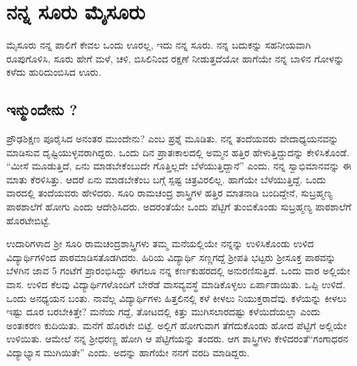 {\fontsize{14}{16}\selectfont
\chapter{ನನ್ನ ಸೂರು ಮೈಸೂರು}


ಮೈಸೂರು ನನ್ನ ಪಾಲಿಗೆ ಕೇವಲ ಒಂದು ಊರಲ್ಲ, ಇದು ನನ್ನ ಸೂರು.  ನನ್ನ \hbox{ಬದುಕನ್ನು} ಸಹನೀಯವಾಗಿ ರೂಪುಗೊಳಿಸಿ, ಸೂರು ಹೇಗೆ ಮಳೆ, ಚಳಿ, ಬಿಸಿಲಿನಿಂದ ರಕ್ಷಣೆ \hbox{ನೀಡುತ್ತದೆಯೋ} ಹಾಗೆಯೇ ನನ್ನ ಬಾಳಿನ ಗೋಳನ್ನು ಕಳೆದು ಹುರಿದುಂಬಿಸಿದ ಊರು.

\section*{ಇನ್ಮುಂದೇನು ?} 

ಪ್ರೌಢಶಿಕ್ಷಣ ಪೂರೈಸಿದ ಅನಂತರ ಮುಂದೇನು? ಎಂಬ ಪ್ರಶ್ನೆ ಮೂಡಿತು.  ನನ್ನ ತಂದೆಯವರು ವೇದಾಧ್ಯಯನವನ್ನು ಮಾಡಿಸುವ ದೃಷ್ಟಿಯುಳ್ಳವರಾಗಿದ್ದರು.  ಒಂದು ದಿನ ಪ್ರಾತಃಕಾಲದಲ್ಲಿ ಅಮ್ಮನ ಹತ್ತಿರ ಹೇಳುತ್ತಿದ್ದುದನ್ನು ಕೇಳಿಸಿಕೊಂಡೆ.  “ಮೀಸೆ \hbox{ಮೂಡುತ್ತಿದೆ,} ಏನು ಮಾಡಬೇಕೆಂಬುದೇ ಗೊತ್ತಿಲ್ಲದೇ ಬೆಳೆಯುತ್ತಿದ್ದಾನೆ” ಎಂದು.   ನನ್ನ ಸ್ವಾಭಿಮಾನವನ್ನು ಈ ಮಾತು ಕೆರಳಿಸಿತ್ತು.  ಆದರೆ ಏನು ಮಾಡಬೇಕೆಂಬ ಬಗ್ಗೆ ಸ್ಪಷ್ಟ ಚಿತ್ರವಿರಲಿಲ್ಲ.  ಹಾಗೆಯೇ ಬೆಳೆಯುತ್ತಿದ್ದೆ.  ಒಂದು ವಾರದಲ್ಲಿ ತಂದೆಯವರು ಹೇಳಿದರು.  ಸೂರಿ ರಾಮಚಂದ್ರ ಶಾಸ್ತ್ರಿಗಳ ಹತ್ತಿರ ಮಾತನಾಡಿ ಬಂದಿದ್ದೇನೆ, ಸುಬ್ರಹ್ಮಣ್ಯ \hbox{ಪಾಠಶಾಲೆಗೆ} ಹೋಗು ಎಂದು ಆದೇಶಿಸಿದರು. ಅದರಂತೆಯೇ ಒಂದು ಪೆಟ್ಟಿಗೆ ತುಂಬಿಕೊಂಡು \hbox{ಸುಬ್ರಹ್ಮಣ್ಯ} ಪಾಠಶಾಲೆಗೆ ಹೊರಟೇಬಿಟ್ಟೆ.  

ಉದಾರಿಗಳಾದ ಶ್ರೀ ಸೂರಿ ರಾಮಚಂದ್ರಶಾಸ್ತ್ರಿಗಳು ತಮ್ಮ ಮನೆಯಲ್ಲಿಯೇ ನನ್ನನ್ನು ಉಳಿಸಿಕೊಂಡು ಉಳಿದ ವಿದ್ಯಾರ್ಥಿಗಳಿಂದ ಪಾಠಮಾಡಿಸತೊಡಗಿದರು.  ಹಿರಿಯ ವಿದ್ಯಾರ್ಥಿ ಸಣ್ಣಗದ್ದೆ ಶ್ರೀಪತಿ ಭಟ್ಟರು ಶ್ರೀಸೂಕ್ತ ಪಾಠವನ್ನು ಬೆಳಗಿನ ಜಾವ 5 ಗಂಟೆಗೆ ಪ್ರಾರಂಭಿಸಿದ್ದು ಈಗಲೂ ನನ್ನ ಕರ್ಣಕುಹರದಲ್ಲಿ  ಅನುರಣಿಸುತ್ತಿದೆ.  ಒಂದು ವಾರ ಅಲ್ಲಿಯೇ ವಾಸ.  ಉಳಿದ ಕೆಲವು ವಿದ್ಯಾರ್ಥಿಗಳೊಂದಿಗೆ ಬೇರೆಡೆ ವಾಸವ್ಯವಸ್ಥೆ ಮಾಡಿಕೊಳ್ಳಲು ಏರ್ಪಾಡಾಯಿತು.  ಒಪ್ಪಿ ಉಳಿದೆ.  ಒಂದು ಅನಧ್ಯಯನ ಬಂತು.  ನಾವೆಲ್ಲ ವಿದ್ಯಾರ್ಥಿಗಳು ಹಿತ್ತಲಿನಲ್ಲಿ ಕಳೆ ಕೀಳಲು ನಿಯುಕ್ತರಾದೆವು.  ಕಳೆಯನ್ನು ಕೀಳಲು ಇಷ್ಟು ದೂರ ಬರಬೇಕಿತ್ತೇ? ಮನೆಯ ಗದ್ದೆ, ತೋಟದಲ್ಲಿ ಕಿತ್ತು ಮುಗಿಸಲಾರದಷ್ಟು ಕಳೆಯಿದೆಯಲ್ಲಾ ಎಂದು ಅಂತಃಕರಣ ಕುದಿಯಿತು.  ಮನೆಗೆ ಹೊರಟೇ ಬಿಟ್ಟೆ.  ಅಲ್ಲಿಗೆ ಹೋಗುವಾಗ ತೆಗೆದುಕೊಂಡು ಹೋದ ಪೆಟ್ಟಿಗೆ ಅಲ್ಲಿಯೇ ಉಳಿಯಿತು. ಆಮೇಲೆ ನನ್ನ ಶ್ರೀಧರಣ್ಣ ಹೋಗಿ ಆ ಪೆಟ್ಟಿಗೆಯನ್ನು ತಂದರು. ಆಗ ಶಾಸ್ತ್ರಿಗಳು ಕೇಳಿದರಂತೆ\break  “ಗಂಗಾಧರನ ವಿದ್ಯಾಭ್ಯಾಸ ಮುಗಿಯಿತೇ” ಎಂದು. ಅದನ್ನು ಹಾಗೆಯೇ ನನಗೆ ವರದಿ ಮಾಡಿದ್ದರು. 

}

